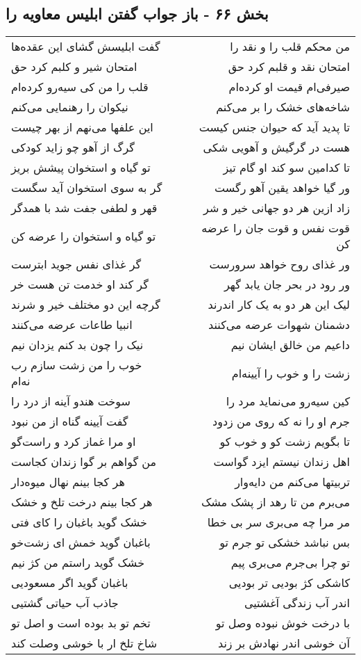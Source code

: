 \begin{center}
\section*{بخش ۶۶ - باز جواب گفتن ابلیس معاویه را}
\label{sec:sh066}
\begin{longtable}{l p{0.5cm} r}
گفت ابلیسش گشای این عقده‌ها
&&
من محکم قلب را و نقد را
\\
امتحان شیر و کلبم کرد حق
&&
امتحان نقد و قلبم کرد حق
\\
قلب را من کی سیه‌رو کرده‌ام
&&
صیرفی‌ام قیمت او کرده‌ام
\\
نیکوان را رهنمایی می‌کنم
&&
شاخه‌های خشک را بر می‌کنم
\\
این علفها می‌نهم از بهر چیست
&&
تا پدید آید که حیوان جنس کیست
\\
گرگ از آهو چو زاید کودکی
&&
هست در گرگیش و آهویی شکی
\\
تو گیاه و استخوان پیشش بریز
&&
تا کدامین سو کند او گام تیز
\\
گر به سوی استخوان آید سگست
&&
ور گیا خواهد یقین آهو رگست
\\
قهر و لطفی جفت شد با همدگر
&&
زاد ازین هر دو جهانی خیر و شر
\\
تو گیاه و استخوان را عرضه کن
&&
قوت نفس و قوت جان را عرضه کن
\\
گر غذای نفس جوید ابترست
&&
ور غذای روح خواهد سرورست
\\
گر کند او خدمت تن هست خر
&&
ور رود در بحر جان یابد گهر
\\
گرچه این دو مختلف خیر و شرند
&&
لیک این هر دو به یک کار اندرند
\\
انبیا طاعات عرضه می‌کنند
&&
دشمنان شهوات عرضه می‌کنند
\\
نیک را چون بد کنم یزدان نیم
&&
داعیم من خالق ایشان نیم
\\
خوب را من زشت سازم رب نه‌ام
&&
زشت را و خوب را آیینه‌ام
\\
سوخت هندو آینه از درد را
&&
کین سیه‌رو می‌نماید مرد را
\\
گفت آیینه گناه از من نبود
&&
جرم او را نه که روی من زدود
\\
او مرا غماز کرد و راست‌گو
&&
تا بگویم زشت کو و خوب کو
\\
من گواهم بر گوا زندان کجاست
&&
اهل زندان نیستم ایزد گواست
\\
هر کجا بینم نهال میوه‌دار
&&
تربیتها می‌کنم من دایه‌وار
\\
هر کجا بینم درخت تلخ و خشک
&&
می‌برم من تا رهد از پشک مشک
\\
خشک گوید باغبان را کای فتی
&&
مر مرا چه می‌بری سر بی خطا
\\
باغبان گوید خمش ای زشت‌خو
&&
بس نباشد خشکی تو جرم تو
\\
خشک گوید راستم من کژ نیم
&&
تو چرا بی‌جرم می‌بری پیم
\\
باغبان گوید اگر مسعودیی
&&
کاشکی کژ بودیی تر بودیی
\\
جاذب آب حیاتی گشتیی
&&
اندر آب زندگی آغشتیی
\\
تخم تو بد بوده است و اصل تو
&&
با درخت خوش نبوده وصل تو
\\
شاخ تلخ ار با خوشی وصلت کند
&&
آن خوشی اندر نهادش بر زند
\\
\end{longtable}
\end{center}
